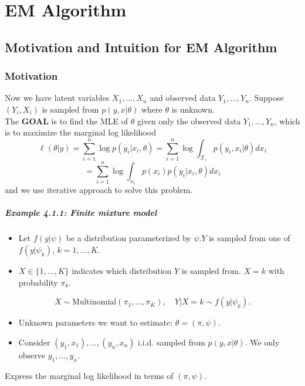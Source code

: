 \documentclass[12pt]{book}
\theoremstyle{definition}
\theoremstyle{remark}
\begin{document}
\newpage{}
\chapter{EM Algorithm}
\section{Motivation and Intuition for EM Algorithm}
\subsection{Motivation}
Now we have latent variables $X_1, \dots, X_n$ and observed data $Y_1,\dots, Y_n$. Suppose $(Y_i, X_i)$ is sampled from $ p(y,x|\theta)$ where $\theta$ is unknown. \\
The \textbf{GOAL} is to find the MLE of $\theta$ given only the observed data $Y_1,\dots, Y_n$, which is to maximize the marginal log likelihood
\[\ell (\theta|y) = \sum_{i=1}^n \log p(y_i|x_i,\theta) = \sum_{i=1}^n \log \int_{\mathcal{X}_i}p(y_i,x_i|\theta)dx_i\]
\[=\sum_{i=1}^n \log \int_{x_i}p(x_i)p(y_i|x_i,\theta)dx_i\]
and we use iterative approach to solve this problem.


\paragraph{Example 4.1.1: Finite mixture model}

\begin{itemize}
    \item Let \( f(y|\psi) \) be a distribution parameterized by \( \psi \).\( Y \) is sampled from one of \( f(y|\psi_k) \), \( k = 1, \dots, K \).
    \item \( X \in \{1, \dots, K\} \) indicates which distribution \( Y \) is sampled from. \( X = k \) with probability \( \pi_k \).
\end{itemize}

\[
X \sim \text{Multinomial}(\pi_1, \dots, \pi_K), \quad Y | X = k \sim f(y|\psi_k).
\]

\begin{itemize}
    \item Unknown parameters we want to estimate: \( \theta = (\pi, \psi) \).
    \item Consider \( (y_1, x_1), \dots, (y_n, x_n) \) i.i.d. sampled from \( p(y, x | \theta) \). We only observe \( y_1, \dots, y_n \).
\end{itemize}

Express the marginal log likelihood in terms of $(\pi, \psi)$.
\end{document}
